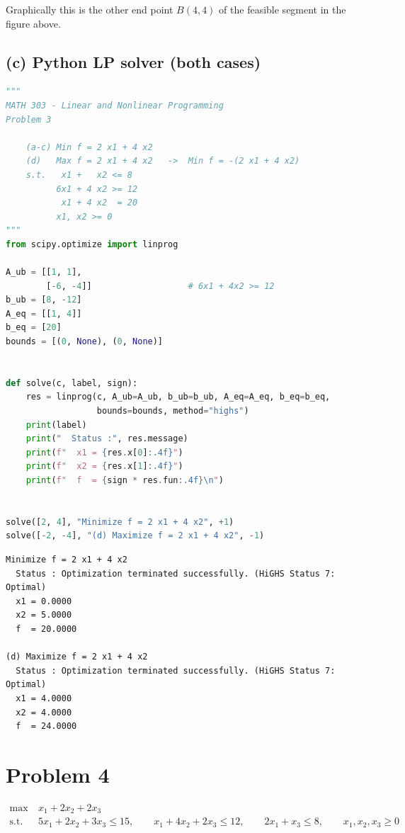 \documentclass[11pt,a4paper]{article}
\newcommand{\answer}[1]{\begin{center}\fbox{\parbox{0.9\linewidth}{\centering\textbf{Answer:} #1}}\end{center}}
\begin{document}
\answer{$x_1^*=4,\ x_2^*=4,\ \max f=24$ \quad ($x_4=28$).}

Graphically this is the other end point $B(4,4)$ of the feasible segment in the figure above.

\subsection*{(c) Python LP solver (both cases)}
\begin{lstlisting}[language=Python]
"""
MATH 303 - Linear and Nonlinear Programming
Problem 3

    (a-c) Min f = 2 x1 + 4 x2
    (d)   Max f = 2 x1 + 4 x2   ->  Min f = -(2 x1 + 4 x2)
    s.t.   x1 +   x2 <= 8
          6x1 + 4 x2 >= 12
           x1 + 4 x2  = 20
          x1, x2 >= 0
"""
from scipy.optimize import linprog

A_ub = [[1, 1],
        [-6, -4]]                   # 6x1 + 4x2 >= 12
b_ub = [8, -12]
A_eq = [[1, 4]]
b_eq = [20]
bounds = [(0, None), (0, None)]


def solve(c, label, sign):
    res = linprog(c, A_ub=A_ub, b_ub=b_ub, A_eq=A_eq, b_eq=b_eq,
                  bounds=bounds, method="highs")
    print(label)
    print("  Status :", res.message)
    print(f"  x1 = {res.x[0]:.4f}")
    print(f"  x2 = {res.x[1]:.4f}")
    print(f"  f  = {sign * res.fun:.4f}\n")


solve([2, 4], "Minimize f = 2 x1 + 4 x2", +1)
solve([-2, -4], "(d) Maximize f = 2 x1 + 4 x2", -1)
\end{lstlisting}
\begin{lstlisting}[style=out]
Minimize f = 2 x1 + 4 x2
  Status : Optimization terminated successfully. (HiGHS Status 7: Optimal)
  x1 = 0.0000
  x2 = 5.0000
  f  = 20.0000

(d) Maximize f = 2 x1 + 4 x2
  Status : Optimization terminated successfully. (HiGHS Status 7: Optimal)
  x1 = 4.0000
  x2 = 4.0000
  f  = 24.0000
\end{lstlisting}

\newpage
\section{Problem 4}
\begin{align*}
\max\ & x_1+2x_2+2x_3\\
\text{s.t. } & 5x_1+2x_2+3x_3\le 15,\qquad x_1+4x_2+2x_3\le 12,\qquad 2x_1+x_3\le 8,\qquad x_1,x_2,x_3\ge 0
\end{align*}
\end{document}
